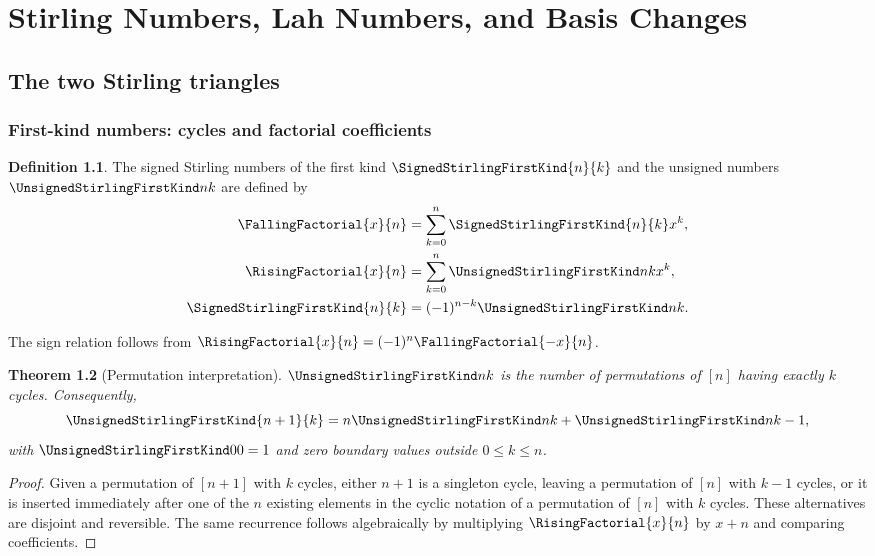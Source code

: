 \documentclass[11pt,a4paper,oneside,openany]{book}
\newtheorem{theorem}{Theorem}[chapter]
\theoremstyle{definition}
\newtheorem{definition}[theorem]{Definition}
\theoremstyle{remark}
\begin{document}
\part{Stirling Numbers, Lah Numbers, and Basis Changes}

\chapter{The two Stirling triangles}
\label{ch:stirling-def}

\section{First-kind numbers: cycles and factorial coefficients}
\begin{definition}
The signed Stirling numbers of the first kind $\SignedStirlingFirstKind{n}{k}$ and the unsigned numbers
$\UnsignedStirlingFirstKind nk$ are defined by
\begin{align}
 \FallingFactorial{x}{n}&=\sum_{k=0}^n \SignedStirlingFirstKind{n}{k}x^k,\label{eq:signed-first-def}\\
 \RisingFactorial{x}{n}&=\sum_{k=0}^n\UnsignedStirlingFirstKind nkx^k,\label{eq:unsigned-first-def}\\
 \SignedStirlingFirstKind{n}{k}&=(-1)^{n-k}\UnsignedStirlingFirstKind nk.\label{eq:first-sign}
\end{align}
\end{definition}
The sign relation follows from
$\RisingFactorial{x}{n}=(-1)^n\FallingFactorial{-x}{n}$.

\begin{theorem}[Permutation interpretation]\label{thm:first-cycle}
$\UnsignedStirlingFirstKind nk$ is the number of permutations of $[n]$ having exactly $k$ cycles.
Consequently,
\begin{equation}\label{eq:first-recurrence}
 \UnsignedStirlingFirstKind{n+1}{k}=n\UnsignedStirlingFirstKind nk+\UnsignedStirlingFirstKind n{k-1},
\end{equation}
with $\UnsignedStirlingFirstKind00=1$ and zero boundary values outside $0\le k\le n$.
\end{theorem}
\begin{proof}
Given a permutation of $[n+1]$ with $k$ cycles, either $n+1$ is a singleton cycle,
leaving a permutation of $[n]$ with $k-1$ cycles, or it is inserted immediately
after one of the $n$ existing elements in the cyclic notation of a permutation of
$[n]$ with $k$ cycles.  These alternatives are disjoint and reversible.
The same recurrence follows algebraically by multiplying
$\RisingFactorial{x}{n}$ by $x+n$ and comparing coefficients.
\end{proof}
\end{document}
